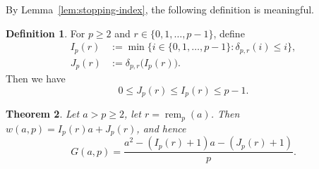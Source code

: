 \documentclass[reqno, 12pt]{article}
\numberwithin{equation}{section}
\newtheorem{theorem}{Theorem}[section]
\theoremstyle{definition}
\newtheorem{definition}[theorem]{Definition}
\newcommand{\remp}{\operatorname{rem}}
\begin{document}
By Lemma~\ref{lem:stopping-index}, the following definition is meaningful.

\begin{definition}\label{def:IJ}
For $p\ge2$ and $r\in\{0,1,\ldots,p-1\}$, define
\begin{align}
 I_p(r)&:=\min\{i\in\{0,1,\ldots,p-1\}:\delta_{p,r}(i)\le i\},\label{eq:def-I}\\
 J_p(r)&:=\delta_{p,r}\bigl(I_p(r)\bigr).\nonumber
\end{align}
Then we have 
\begin{equation}\label{eq:IJ-bounds}
   0\le J_p(r)\le I_p(r)\le p-1.
\end{equation}
\end{definition}

\begin{theorem}\label{thm:exact-formula}
Let $a>p\ge2$, let $r=\remp_p(a)$. Then $w(a,p)=I_p(r)a+J_p(r)$, and hence
\begin{equation}\label{eq:G-exact}
G(a,p)=\frac{a^2-(I_p(r)+1)a-(J_p(r)+1)}{p}.
\end{equation}
\end{theorem}
\end{document}
